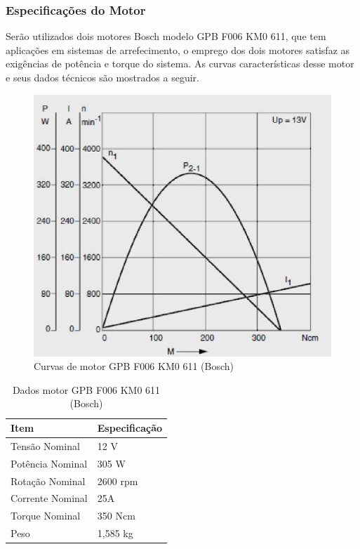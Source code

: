 \subsubsection{Especificações do Motor}

Serão utilizados dois motores Bosch modelo GPB F006 KM0 611, que tem aplicações
em sistemas de arrefecimento, o emprego dos dois motores satisfaz as exigências
de potência e torque do sistema. As curvas características desse motor e seus
dados técnicos são mostrados a seguir.

\begin{figure}[H]
  \centering
    \includegraphics[width=\textwidth]{figuras/motor.eps}
  \caption{Curvas de motor GPB F006 KM0 611 (Bosch)}
  \label{fig:motor}
\end{figure}

\begin{table}[h]
\centering
\vspace{0.5cm}
\begin{tabular}{|l|l|}
\hline
Item                & Especificação \\
\hline
Tensão Nominal      & 12 V \\
Potência Nominal    & 305 W \\
Rotação Nominal     & 2600 rpm \\
Corrente Nominal    & 25A \\
Torque Nominal      & 350 Ncm \\
Peso                & 1,585 kg \\
\hline
\end{tabular}
\caption{Dados motor GPB F006 KM0 611 (Bosch)}
\label{tab:dadosmotor}
\end{table}

